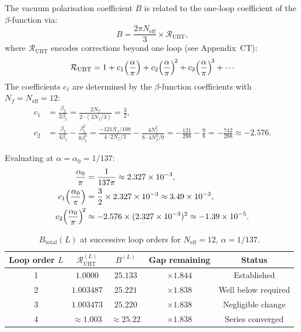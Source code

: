 \documentclass[11pt,a4paper]{article}
\theoremstyle{remark}
\begin{document}
The vacuum polarisation coefficient $B$ is related to the one-loop coefficient of the $\beta$-function via:
\begin{equation}
  B = \frac{2\pi N_{\mathrm{eff}}}{3} \times \mathcal{R}_{\mathrm{UBT}},
  \label{eq:B_with_R}
\end{equation}
where $\mathcal{R}_{\mathrm{UBT}}$ encodes corrections beyond one loop (see Appendix~CT):
\begin{equation}
  \mathcal{R}_{\mathrm{UBT}} = 1 + c_1 \Bigl(\frac{\alpha}{\pi}\Bigr) + c_2 \Bigl(\frac{\alpha}{\pi}\Bigr)^{\!2} + c_3 \Bigl(\frac{\alpha}{\pi}\Bigr)^{\!3} + \cdots
  \label{eq:R_series}
\end{equation}
The coefficients $c_\ell$ are determined by the $\beta$-function coefficients with $N_f = N_{\mathrm{eff}} = 12$:
\begin{align}
  c_1 &= \frac{\beta_2}{2\beta_1} = \frac{2N_f}{2 \cdot (2N_f/3)} = \frac{3}{2}, \label{eq:c1} \\
  c_2 &= \frac{\beta_3}{4\beta_1} - \frac{\beta_2^2}{8\beta_1^2} = \frac{-121N_f/108}{4 \cdot 2N_f/3} - \frac{4N_f^2}{8 \cdot 4N_f^2/9}
       = -\frac{121}{288} - \frac{9}{8} = -\frac{742}{288} \approx -2.576.
  \label{eq:c2}
\end{align}

Evaluating at $\alpha = \alpha_0 = 1/137$:
\begin{align}
  \frac{\alpha_0}{\pi} &= \frac{1}{137\pi} \approx 2.327 \times 10^{-3}, \label{eq:alpha_over_pi}\\
  c_1 \Bigl(\frac{\alpha_0}{\pi}\Bigr) &= \frac{3}{2} \times 2.327 \times 10^{-3} \approx 3.49 \times 10^{-3}, \label{eq:c1_numerical}\\
  c_2 \Bigl(\frac{\alpha_0}{\pi}\Bigr)^{\!2} &\approx -2.576 \times (2.327\times10^{-3})^2 \approx -1.39 \times 10^{-5}.
  \label{eq:c2_numerical}
\end{align}

\begin{table}[h]
  \centering
  \caption{$B_{\mathrm{total}}(L)$ at successive loop orders for $N_{\mathrm{eff}} = 12$,
    $\alpha = 1/137$.}
  \label{tab:B_multiloop}
  \begin{tabular}{ccccc}
    \toprule
    Loop order $L$ & $\mathcal{R}_{\mathrm{UBT}}^{(L)}$ & $B^{(L)}$ & Gap remaining & Status \\
    \midrule
    1 & $1.0000$         & $25.133$ & $\times 1.844$ & Established \\
    2 & $1.003487$       & $25.221$ & $\times 1.838$ & Well below required \\
    3 & $1.003473$       & $25.220$ & $\times 1.838$ & Negligible change \\
    4 & $\approx 1.003$  & $\approx 25.22$ & $\times 1.838$ & Series converged \\
    \bottomrule
  \end{tabular}
\end{table}
\end{document}
